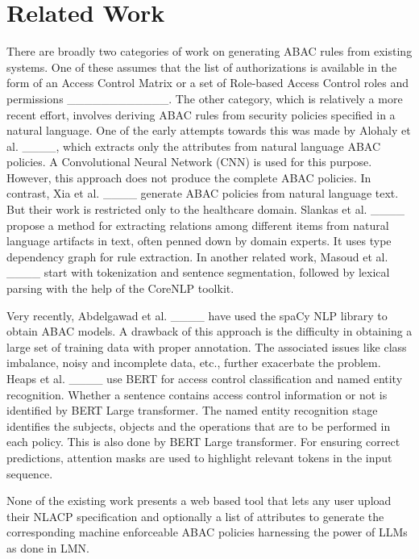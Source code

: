 \section{Related Work}
\label{sec:related}

There are broadly two categories of work on generating ABAC rules from existing systems. One of these assumes that the list of authorizations is available in the form of an Access Control Matrix or a set of Role-based Access Control roles and permissions ____________. 
The other category, which is relatively a more recent effort, involves deriving ABAC rules from security policies specified in a natural language. 
One of the early attempts towards this was made by Alohaly et al. ____, which extracts only the attributes from natural language ABAC policies. A Convolutional Neural Network (CNN) is used for this purpose. However, this approach does not produce the complete ABAC policies. In contrast, Xia et al. ____ generate ABAC policies from natural language text. But their work is restricted only to the healthcare domain. 
Slankas et al. ____ propose a method for extracting relations among different items from natural language artifacts in text, often penned down by domain experts. It uses type dependency graph for rule extraction. 
In another related work, Masoud et al. ____ start with tokenization and sentence segmentation, followed by lexical parsing with the help of the CoreNLP toolkit. 


Very recently, Abdelgawad et al. ____ have used the spaCy NLP library to obtain ABAC models. A drawback of this approach is the difficulty in obtaining a large set of training data with proper annotation. The associated issues like class imbalance, noisy and incomplete data, etc., further exacerbate the problem. Heaps et al. ____ 
use BERT  for access control classification and named entity recognition.  Whether a sentence contains access control information or not is identified by BERT Large transformer. The named entity recognition stage identifies the subjects, objects and the operations that are to be performed in each policy. This is also done by BERT Large transformer. For ensuring correct predictions, attention masks are used to highlight relevant tokens in the input sequence.

None of the existing work presents a web based tool that lets any user upload their NLACP specification and optionally a list of attributes to generate the corresponding machine enforceable ABAC policies harnessing the power of LLMs as done in LMN.